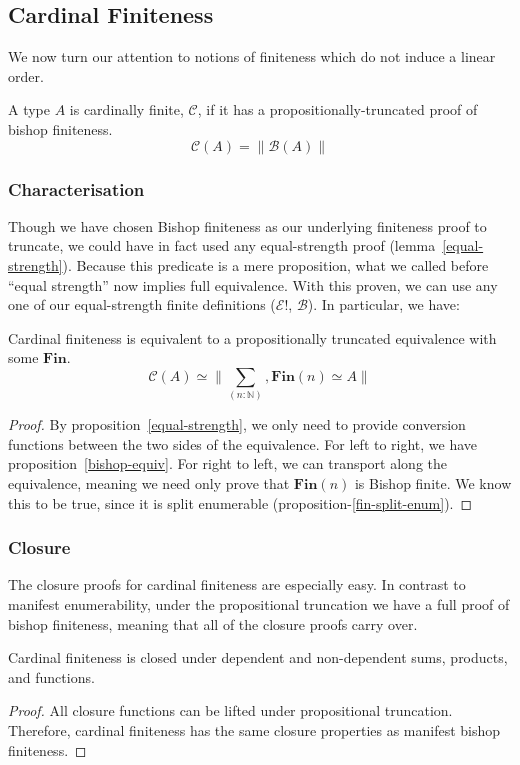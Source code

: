 \subsection{Cardinal Finiteness} \label{cardinal}
We now turn our attention to notions of finiteness which do not induce a linear
order.
\begin{definition}
  A type \(A\) is cardinally finite, \(\mathcal{C}\), if it has a
  propositionally-truncated proof of bishop finiteness.
  \begin{equation}
    \mathcal{C}(A) = \lVert \mathcal{B}(A) \rVert
  \end{equation}
\end{definition}
\subsubsection{Characterisation}
Though we have chosen Bishop finiteness as our underlying finiteness proof to
truncate, we could have in fact used any equal-strength proof
(lemma~\ref{equal-strength}).
Because this predicate is a mere proposition, what we called before ``equal
strength'' now implies full equivalence.
With this proven, we can use any one of our equal-strength finite definitions
(\(\mathcal{E}!\), \(\mathcal{B}\)).
In particular, we have:
\begin{lemma}
  Cardinal finiteness is equivalent to a propositionally truncated equivalence
  with some \(\textbf{Fin}\).
  \begin{equation}
    \mathcal{C}(A) \simeq \lVert \sum_{(n : \mathbb{N})} , \textbf{Fin}(n) \simeq A \rVert
  \end{equation}
\end{lemma}
\begin{proof}
  By proposition~\ref{equal-strength}, we only need to provide conversion
  functions between the two sides of the equivalence.
  For left to right, we have proposition~\ref{bishop-equiv}.
  For right to left, we can transport along the equivalence, meaning we need
  only prove that \(\textbf{Fin}(n)\) is Bishop finite.
  We know this to be true, since it is split enumerable
  (proposition-\ref{fin-split-enum}).
\end{proof}
\subsubsection{Closure}
The closure proofs for cardinal finiteness are especially easy.
In contrast to manifest enumerability, under the propositional truncation we
have a full proof of bishop finiteness, meaning that all of the closure proofs
carry over.
\begin{lemma}
  Cardinal finiteness is closed under dependent and non-dependent sums,
  products, and functions.
\end{lemma}
\begin{proof}
  All closure functions can be lifted under propositional truncation.
  Therefore, cardinal finiteness has the same closure properties as manifest
  bishop finiteness.
\end{proof}
